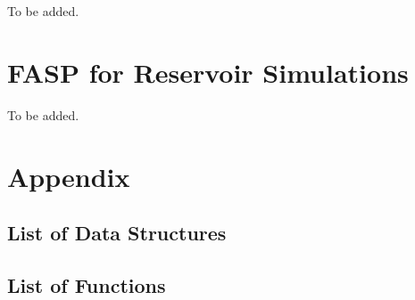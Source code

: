 \documentclass[11pt]{memoir}
\begin{document}
To be added.

\chapter{FASP for Reservoir Simulations}\label{ch:blkoil}

To be added.


\chapter*{Appendix}\label{ch:append}

\section*{List of Data Structures}

\section*{List of Functions}


\newpage
\begin{footnotesize}


\end{footnotesize}
\end{document}
